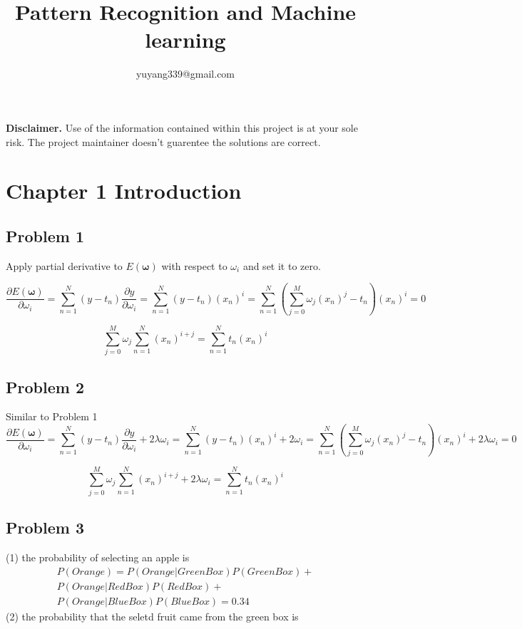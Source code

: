 \documentclass{article}
\author{yuyang339@gmail.com}
\title{Pattern Recognition and Machine learning}
\date{}
\begin{document}
\maketitle

\textbf{Disclaimer.} Use of the information contained within this project is at your sole risk. The project maintainer doesn't guarentee the solutions are correct.

\section*{Chapter 1 Introduction}
\subsection*{Problem 1}
\begin{flushleft}
Apply partial derivative to $E(\boldsymbol{\omega})$ with respect to $\omega_{i}$ and set it to zero.

\begin{equation}
\frac{\partial E(\boldsymbol{\omega})}{\partial \omega_{i}} = \sum_{n=1}^{N}{(y-t_{n})}\frac{\partial y}{\partial \omega_{i}} = \sum_{n=1}^{N}{(y-t_{n})}(x_{n})^i =\sum_{n=1}^{N}{(\sum_{j=0}^{M}\omega_{j}(x_{n})^{j}-t_{n})}(x_{n})^i = 0
\end{equation}

\begin{equation}
\sum_{j=0}^{M}\omega_{j}\sum_{n=1}^{N}{(x_{n})^{i+j}= \sum_{n=1}^{N}t_{n}}(x_{n})^i 
\end{equation}


\subsection*{Problem 2}
Similar to Problem 1
\begin{equation}
\frac{\partial E(\boldsymbol{\omega})}{\partial \omega_{i}} = \sum_{n=1}^{N}{(y-t_{n})}\frac{\partial y}{\partial \omega_{i}} + 2\lambda\omega_{i} = \sum_{n=1}^{N}{(y-t_{n})}(x_{n})^i + 2\omega_{i} =\sum_{n=1}^{N}{(\sum_{j=0}^{M}\omega_{j}(x_{n})^{j}-t_{n})}(x_{n})^i + 2\lambda\omega_{i}= 0
\end{equation}

\begin{equation}
\sum_{j=0}^{M}\omega_{j}\sum_{n=1}^{N}{(x_{n})^{i+j} + 2\lambda\omega_{i}= \sum_{n=1}^{N}t_{n}}(x_{n})^i 
\end{equation}

\subsection*{Problem 3}
(1) the probability of selecting an apple is
\begin{equation}
\begin{split}
P(Orange) = P(Orange|Green Box)P(Green Box) + \\
 P(Orange|Red Box)P(Red Box)+ \\
 P(Orange|Blue Box)P(Blue Box) = 0.34
 \end{split}
\end{equation}
(2) the probability that the seletd fruit came from the green box is 


\end{flushleft}
\end{document}
